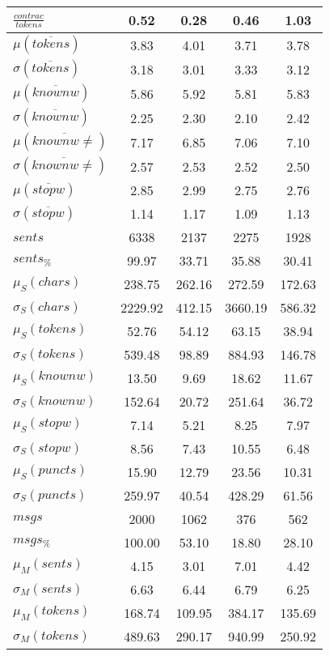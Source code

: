 \begin{table}[h!]
\begin{center}
\begin{tabular}{| l || c | c | c | c |}
$\frac{contrac}{tokens}$ & 0.52  & 0.28  & 0.46  & 1.03 \\\hline\hline
$\mu(\overline{tokens})$ & 3.83  & 4.01  & 3.71  & 3.78 \\
$\sigma(\overline{tokens})$ & 3.18  & 3.01  & 3.33  & 3.12 \\\hline
$\mu(\overline{knownw})$ & 5.86  & 5.92  & 5.81  & 5.83 \\
$\sigma(\overline{knownw})$ & 2.25  & 2.30  & 2.10  & 2.42 \\\hline
$\mu(\overline{knownw \neq})$ & 7.17  & 6.85  & 7.06  & 7.10 \\
$\sigma(\overline{knownw \neq})$ & 2.57  & 2.53  & 2.52  & 2.50 \\\hline
$\mu(\overline{stopw})$ & 2.85  & 2.99  & 2.75  & 2.76 \\
$\sigma(\overline{stopw})$ & 1.14  & 1.17  & 1.09  & 1.13 \\\hline\hline
$sents$ & 6338  & 2137  & 2275  & 1928 \\
$sents_{\%}$ & 99.97  & 33.71  & 35.88  & 30.41 \\\hline
$\mu_S(chars)$ & 238.75  & 262.16  & 272.59  & 172.63 \\
$\sigma_S(chars)$ & 2229.92  & 412.15  & 3660.19  & 586.32 \\\hline
$\mu_S(tokens)$ & 52.76  & 54.12  & 63.15  & 38.94 \\
$\sigma_S(tokens)$ & 539.48  & 98.89  & 884.93  & 146.78 \\\hline
$\mu_S(knownw)$ & 13.50  & 9.69  & 18.62  & 11.67 \\
$\sigma_S(knownw)$ & 152.64  & 20.72  & 251.64  & 36.72 \\\hline
$\mu_S(stopw)$ & 7.14  & 5.21  & 8.25  & 7.97 \\
$\sigma_S(stopw)$ & 8.56  & 7.43  & 10.55  & 6.48 \\\hline
$\mu_S(puncts)$ & 15.90  & 12.79  & 23.56  & 10.31 \\
$\sigma_S(puncts)$ & 259.97  & 40.54  & 428.29  & 61.56 \\\hline\hline
$msgs$ & 2000  & 1062  & 376  & 562 \\
$msgs_{\%}$ & 100.00  & 53.10  & 18.80  & 28.10 \\\hline
$\mu_M(sents)$ & 4.15  & 3.01  & 7.01  & 4.42 \\
$\sigma_M(sents)$ & 6.63  & 6.44  & 6.79  & 6.25 \\\hline
$\mu_M(tokens)$ & 168.74  & 109.95  & 384.17  & 135.69 \\
$\sigma_M(tokens)$ & 489.63  & 290.17  & 940.99  & 250.92 \\\hline

\end{tabular}
\end{center}
\end{table}
